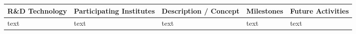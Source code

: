 \thispagestyle{empty}
\begin{landscape}
    \centering
    \begin{adjustbox}{max width=1\textwidth,totalheight=1\textheight}
\begin{tabularx}{\textheight}{lXXXX}
    \toprule
    R\&D Technology & Participating Institutes & Description / Concept & Milestones & Future Activities \\
    \midrule
    text & text & text & text & text\\
    \bottomrule
\end{tabularx}
\end{adjustbox}
\end{landscape}
\restoregeometry
